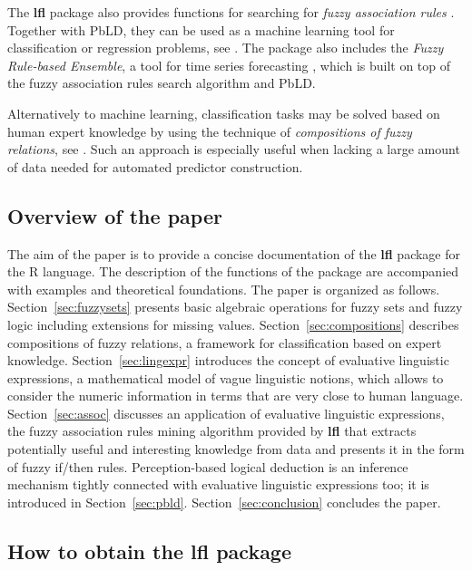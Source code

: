 \documentclass[review]{elsarticle}
\newcommand{\pkg}[1]{\textbf{#1}}
\newcommand{\proglang}[1]{#1}
\newcommand{\R}{\proglang{R}}
\begin{document}
The \pkg{lfl} package also provides functions for searching for \emph{fuzzy association rules} \citep{srikant95}. Together
with PbLD, they can be used as a machine learning tool for classification or regression problems, see \cite{KupkaRusnok:Regression_ESWA_INS17}.
The package also includes the \emph{Fuzzy Rule-based Ensemble}, a tool for time series forecasting
\citep{StepBurda:FRBE_FSS}, which is built on top of the fuzzy association rules search algorithm and PbLD.

Alternatively to machine learning, classification tasks may be solved based on human expert knowledge
by using the technique of \emph{compositions of fuzzy relations}, see \cite{Cao2017b,Cao2017,Step_etal:Unavoidable_KNOSYS2020}. Such an approach is especially useful when lacking a large amount of data needed for automated predictor construction.




\subsection{Overview of the paper}

The aim of the paper is to provide a concise documentation of the \pkg{lfl} package for the \R{} language. The description of the functions of the package are accompanied with examples and theoretical foundations. The paper is organized as follows. Section~\ref{sec:fuzzysets} presents basic algebraic operations for fuzzy sets and fuzzy logic including extensions for missing values. Section~\ref{sec:compositions} describes compositions of fuzzy relations, a framework for classification based on expert knowledge. Section~\ref{sec:lingexpr} introduces the concept of evaluative linguistic expressions, a mathematical model of vague linguistic notions, which allows to consider the numeric information in terms that are very close to human language. Section~\ref{sec:assoc} discusses an application of evaluative linguistic expressions, the fuzzy association rules mining algorithm provided by \pkg{lfl} that extracts potentially useful and interesting knowledge from data and presents it in the form of fuzzy if/then rules. Perception-based logical deduction is an inference mechanism tightly connected with evaluative linguistic expressions too; it is introduced in Section~\ref{sec:pbld}. Section~\ref{sec:conclusion} concludes the paper.




\subsection[How to obtain the lfl package]{How to obtain the \pkg{lfl} package} \label{sec:obtaining}
\end{document}
